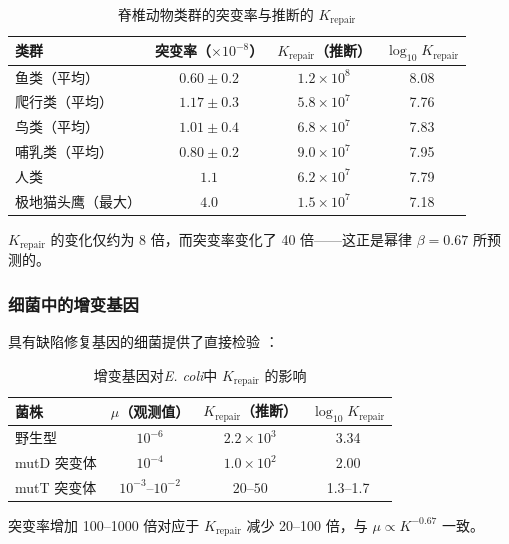 \documentclass[12pt,a4paper]{article}
\theoremstyle{remark}
\begin{document}
	\begin{table}[htbp]
		\centering
		\caption{脊椎动物类群的突变率与推断的 $K_{\text{repair}}$ \cite{Bergeron2023}}
		\label{tab:vertebrate-mutations}
		\small
		\begin{tabular}{lccc}
			\toprule
			\textbf{类群} & \textbf{突变率（$\times 10^{-8}$）} & \textbf{$K_{\text{repair}}$（推断）} & $\log_{10} K_{\text{repair}}$ \\
			\midrule
			鱼类（平均） & $0.60 \pm 0.2$ & $1.2 \times 10^8$ & 8.08 \\
			爬行类（平均） & $1.17 \pm 0.3$ & $5.8 \times 10^7$ & 7.76 \\
			鸟类（平均） & $1.01 \pm 0.4$ & $6.8 \times 10^7$ & 7.83 \\
			哺乳类（平均） & $0.80 \pm 0.2$ & $9.0 \times 10^7$ & 7.95 \\
			人类 & $1.1$ & $6.2 \times 10^7$ & 7.79 \\
			极地猫头鹰（最大） & $4.0$ & $1.5 \times 10^7$ & 7.18 \\
			\bottomrule
		\end{tabular}
	\end{table}
	
	$K_{\text{repair}}$ 的变化仅约为 8 倍，而突变率变化了 40 倍——这正是幂律 $\beta = 0.67$ 所预测的。
	
	\subsubsection{细菌中的增变基因}
	
	具有缺陷修复基因的细菌提供了直接检验 \cite{Drake1991}：
	
	\begin{table}[htbp]
		\centering
		\caption{增变基因对\textit{E. coli}中 $K_{\text{repair}}$ 的影响 \cite{Drake1991}}
		\label{tab:mutators}
		\small
		\begin{tabular}{lccc}
			\toprule
			\textbf{菌株} & $\mu$（观测值） & $K_{\text{repair}}$（推断） & $\log_{10} K_{\text{repair}}$ \\
			\midrule
			野生型 & $10^{-6}$ & $2.2 \times 10^3$ & 3.34 \\
			mutD 突变体 & $10^{-4}$ & $1.0 \times 10^2$ & 2.00 \\
			mutT 突变体 & $10^{-3}$--$10^{-2}$ & $20$--$50$ & 1.3--1.7 \\
			\bottomrule
		\end{tabular}
	\end{table}
	
	突变率增加 100–1000 倍对应于 $K_{\text{repair}}$ 减少 20–100 倍，与 $\mu \propto K^{-0.67}$ 一致。
	
\end{document}
